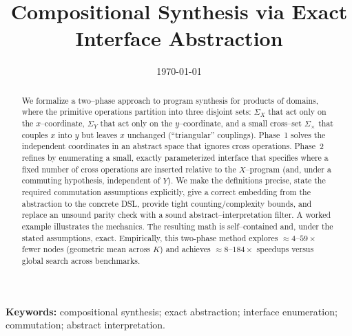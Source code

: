 \documentclass[11pt]{article}
\title{Compositional Synthesis via Exact Interface Abstraction}
\author{}
\date{\today}
\begin{document}
\maketitle

\begin{abstract}
We formalize a two--phase approach to program synthesis for products of domains, where the primitive operations partition into three disjoint sets: $\Sigma_X$ that act only on the $x$--coordinate, $\Sigma_Y$ that act only on the $y$--coordinate, and a small cross--set $\Sigma_\times$ that couples $x$ into $y$ but leaves $x$ unchanged (``triangular'' couplings). Phase~1 solves the independent coordinates in an abstract space that ignores cross operations. Phase~2 refines by enumerating a small, exactly parameterized interface that specifies where a fixed number of cross operations are inserted relative to the $X$--program (and, under a commuting hypothesis, independent of $Y$). We make the definitions precise, state the required commutation assumptions explicitly, give a correct embedding from the abstraction to the concrete DSL, provide tight counting/complexity bounds, and replace an unsound parity check with a sound abstract--interpretation filter. A worked example illustrates the mechanics. The resulting math is self--contained and, under the stated assumptions, exact.
 Empirically, this two-phase method explores $\approx 4$--$59\times$ fewer nodes (geometric mean across $K$) and achieves $\approx 8$--$184\times$ speedups versus global search across benchmarks.
\end{abstract}

\vspace{0.5em}\noindent\textbf{Keywords:} compositional synthesis; exact abstraction; interface enumeration; commutation; abstract interpretation.
\end{document}

